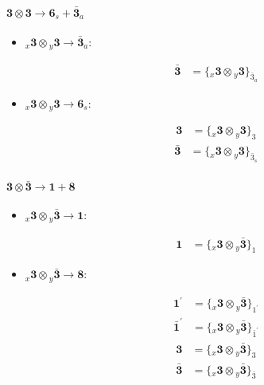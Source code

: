 \documentclass[english]{article}
\newcommand{\cgEqFontsize}{\large}
\newcommand{\rep}[1]{\mathbf{#1}}
\newcommand{\repx}[2]{{}_{#2}\mathbf{#1}}
\newcommand{\tsprod}[2]{\rep{#1}\otimes\rep{#2}}
\newcommand{\tsprodx}[2]{\repx{#1}{x}\otimes\repx{#2}{y}}
\newcommand{\subcgt}[3]{\big\{ \tsprodx{#1}{#2}\big\}^{}_{#3}}
\begin{document}
\paragraph*{\cgEqFontsize $\tsprod{3}{3}\to\rep{6}_s+\rep{\bar{3}}_a$}
\begin{itemize}
\item $\tsprodx{3}{3}\to\rep{\bar{3}}_{a}$:
\begin{fleqn}
\begin{align*}
\rep{\bar{3}} & = \subcgt{3}{3}{\bar{3}_{a}}
\end{align*}
\end{fleqn}
\item $\tsprodx{3}{3}\to\rep{6}_{s}$:
\begin{fleqn}
\begin{align*}
\rep{3} & = \subcgt{3}{3}{3}
\end{align*}
\begin{align*}
\rep{\bar{3}} & = \subcgt{3}{3}{\bar{3}_{s}}
\end{align*}
\end{fleqn}
\end{itemize}
\paragraph*{\cgEqFontsize $\tsprod{3}{\bar{3}}\to\rep{1}+\rep{8}$}
\begin{itemize}
\item $\tsprodx{3}{\bar{3}}\to\rep{1}$:
\begin{fleqn}
\begin{align*}
\rep{1} & = \subcgt{3}{\bar{3}}{1}
\end{align*}
\end{fleqn}
\item $\tsprodx{3}{\bar{3}}\to\rep{8}$:
\begin{fleqn}
\begin{align*}
\rep{1^{\prime}} & = \subcgt{3}{\bar{3}}{1^{\prime}}
\end{align*}
\begin{align*}
\rep{\bar{1}^{\prime}} & = \subcgt{3}{\bar{3}}{\bar{1}^{\prime}}
\end{align*}
\begin{align*}
\rep{3} & = \subcgt{3}{\bar{3}}{3}
\end{align*}
\begin{align*}
\rep{\bar{3}} & = \subcgt{3}{\bar{3}}{\bar{3}}
\end{align*}
\end{fleqn}
\end{itemize}
\end{document}
